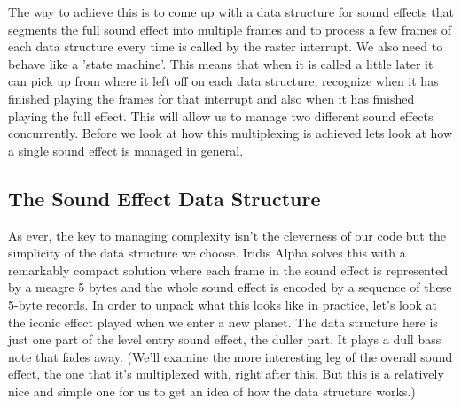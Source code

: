 The way to achieve this is to come up with a data structure for sound effects that segments the full sound effect
into multiple frames and to process a few frames of each data structure every time  is called
by the raster interrupt. We also need  to behave like a 'state machine'. This means that
when it is called a little later it can pick up from where it left off on each data structure, recognize
when it has finished playing the frames for that interrupt and also when it has finished playing the full effect. This
will allow us to manage two different sound effects concurrently. Before we look at how this multiplexing is achieved
lets look at how a single sound effect is managed in general.

\subsection{The Sound Effect Data Structure}
As ever, the key to managing complexity isn't the cleverness of our code but the simplicity of the data structure
we choose. Iridis Alpha solves this with a remarkably compact solution where each frame in the sound effect is represented
by a meagre 5 bytes and the whole sound effect is encoded by a sequence of these 5-byte records. In order to unpack
what this looks like in practice, let's look at the iconic effect played when we enter a new planet. The data structure
here is just one part of the level entry sound effect, the duller part. It plays a dull bass note that fades away. (We'll
examine the more interesting leg of the overall sound effect, the one that it's multiplexed with, right after this. But
this is a relatively nice and simple one for us to get an idea of how the data structure works.) 

